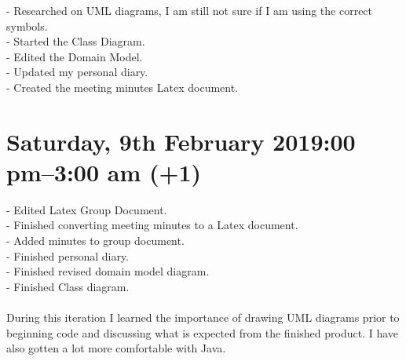 \documentclass[12pt]{article}
\begin{document}
-	Researched on UML diagrams, I am still not sure if I am using the correct symbols.\\ 
-	Started the Class Diagram.\\
-	Edited the Domain Model. \\
-	Updated my personal diary. \\
-	Created the meeting minutes Latex document. \\

\section{Saturday, 9th February 2019:00 pm–3:00 am (+1)  }


-	Edited Latex Group Document. \\
-	Finished converting meeting minutes to a Latex document. \\
-	Added minutes to group document. \\
-	Finished personal diary. \\
-	Finished revised domain model diagram.\\
-	Finished Class diagram. \\ \\
During this iteration I learned the importance of drawing UML diagrams prior to beginning code and discussing what is expected from the finished product. I have also gotten a lot more comfortable with Java. \\
\end{document}
